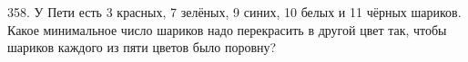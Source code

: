 358. У Пети есть 3 красных, 7 зелёных, 9 синих, 10 белых и 11 чёрных шариков. Какое минимальное число шариков надо перекрасить в другой цвет так, чтобы шариков каждого из пяти цветов было поровну?\\
